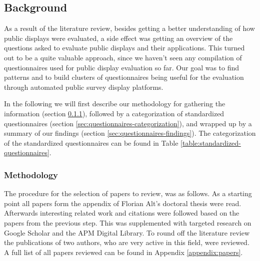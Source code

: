 \subsection{Background}
\label{sec:questionnaires}


As a result of the literature review, besides getting a better understanding of how public displays were evaluated, a side effect was getting an overview of the questions asked to evaluate public displays and their applications. This turned out to be a quite valuable approach, since we haven't seen any compilation of questionnaires used for public display evaluation so far. Our goal was to find patterns and to build clusters of questionnaires being useful for the evaluation through automated public survey display platforms.

In the following we will first describe our methodology for gathering the information (section \ref{sec:questionnaires-methodology}), followed by a categorization of standardized questionnaires (section \ref{sec:questionnaires-categorization}), and wrapped up by a summary of our findings (section \ref{sec:questionnaires-findings}). The categorization of the standardized questionnaires can be found in Table \ref{table:standardized-questionnaires}.





\subsubsection{Methodology}
\label{sec:questionnaires-methodology}

	The procedure for the selection of papers to review, was as follows. As a starting point all papers form the appendix of Florian Alt's doctoral thesis \cite{alt2013thesis} were read. Afterwards interesting related work and citations were followed based on the papers from the previous step. This was supplemented with targeted research on Google Scholar and the APM Digital Library. To round off the literature review the publications of two authors, who are very active in this field, were reviewed. A full list of all papers reviewed can be found in Appendix \ref{appendix:papers}.

